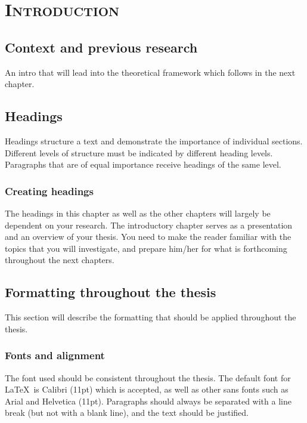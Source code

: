 %
%
% 
% 
% 

\chapter{\textsc{Introduction}}
\label{chap:intro}

\section{Context and previous research }
\label{sec:context}


An intro that will lead into the theoretical framework which follows in the next chapter.

\section{Headings}
\label{sec:heading}

Headings structure a text and demonstrate the importance of individual sections. Different levels of structure must be indicated by different heading levels. 
Paragraphs that are of equal importance receive headings of the same level.

\subsection{Creating headings}
\label{sec:createheadings}

The headings in this chapter as well as the other chapters will largely be dependent on your research. The introductory chapter serves as a presentation and an overview of your thesis. You need to make the reader familiar with the topics that you will investigate, and prepare him/her for what is forthcoming throughout the next chapters. 

\section{Formatting throughout the thesis}
This section will describe the formatting that should be applied throughout the thesis.

\subsection{Fonts and alignment}
\label{sec:fonts}
The font used should be consistent throughout the thesis. The default font for \LaTeX\ is Calibri (11pt) which is accepted, 
as well as other sans fonts such as Arial and Helvetica (11pt). 
Paragraphs should always be separated with a line break (but not with a blank line), and the text should be justified. 

